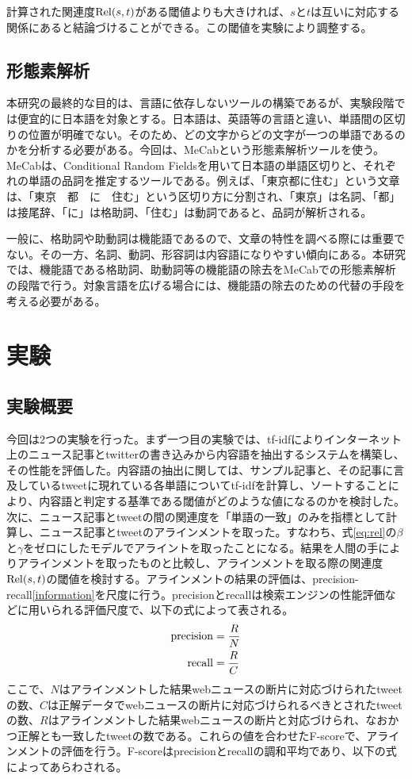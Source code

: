 \documentclass[12pt]{jarticle}
\begin{document}
計算された関連度${\rm Rel}(s, t)$がある閾値よりも大きければ、$s$と$t$は互いに対応する関係にあると結論づけることができる。この閾値を実験により調整する。

\subsection{形態素解析}
本研究の最終的な目的は、言語に依存しないツールの構築であるが、実験段階では便宜的に日本語を対象とする。日本語は、英語等の言語と違い、単語間の区切りの位置が明確でない。そのため、どの文字からどの文字が一つの単語であるのかを分析する必要がある。今回は、MeCab\cite{MeCab}という形態素解析ツールを使う。MeCabは、Conditional Random Fieldsを用いて日本語の単語区切りと、それぞれの単語の品詞を推定するツールである。例えば、「東京都に住む」という文章は、「東京　都　に　住む」という区切り方に分割され、「東京」は名詞、「都」は接尾辞、「に」は格助詞、「住む」は動詞であると、品詞が解析される。

一般に、格助詞や助動詞は機能語であるので、文章の特性を調べる際には重要でない。その一方、名詞、動詞、形容詞は内容語になりやすい傾向にある。本研究では、機能語である格助詞、助動詞等の機能語の除去をMeCabでの形態素解析の段階で行う。対象言語を広げる場合には、機能語の除去のための代替の手段を考える必要がある。

\section{実験}
\subsection{実験概要}
今回は2つの実験を行った。まず一つ目の実験では、tf-idfによりインターネット上のニュース記事とtwitterの書き込みから内容語を抽出するシステムを構築し、その性能を評価した。内容語の抽出に関しては、サンプル記事と、その記事に言及しているtweetに現れている各単語についてtf-idfを計算し、ソートすることにより、内容語と判定する基準である閾値がどのような値になるのかを検討した。次に、ニュース記事とtweetの間の関連度を「単語の一致」のみを指標として計算し、ニュース記事とtweetのアラインメントを取った。すなわち、式\ref{eq:rel}の$\beta$と$\gamma$をゼロにしたモデルでアライントを取ったことになる。結果を人間の手によりアラインメントを取ったものと比較し、アラインメントを取る際の関連度${\rm Rel}(s, t)$の閾値を検討する。アラインメントの結果の評価は、precision-recall\ref{information}を尺度に行う。precisionとrecallは検索エンジンの性能評価などに用いられる評価尺度で、以下の式によって表される。
\begin{align}
  {\rm precision} &= \frac{R}{N}\\
  {\rm recall} &= \frac{R}{C}
\end{align}
  ここで、$N$はアラインメントした結果webニュースの断片に対応づけられたtweetの数、$C$は正解データでwebニュースの断片に対応づけられるべきとされたtweetの数、$R$はアラインメントした結果webニュースの断片と対応づけられ、なおかつ正解とも一致したtweetの数である。これらの値を合わせたF-scoreで、アラインメントの評価を行う。F-scoreはprecisionとrecallの調和平均であり、以下の式によってあらわされる。
\end{document}
